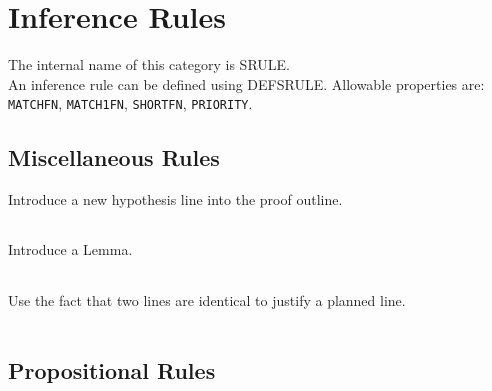 \chapter{Inference Rules}
The internal name of this category is 
SRULE.\\
An inference rule can be defined using DEFSRULE.
Allowable properties are: \texttt{MATCHFN}, \texttt{MATCH1FN}, \texttt{SHORTFN}, \texttt{PRIORITY}.

\section{Miscellaneous Rules}

\begin{description} 

\item[\parbox{\textwidth}{HYP}] \label{HYP}
Introduce a new hypothesis line into the proof outline.\\
\texttt{ }


\item[\parbox{\textwidth}{LEMMA}] \label{LEMMA}
Introduce a Lemma.\\
\texttt{ }


\item[\parbox{\textwidth}{SAME}] \label{SAME}
Use the fact that two lines are identical to justify a planned line.\\
\texttt{ }

\item
\end{description}

\section{Propositional Rules}

